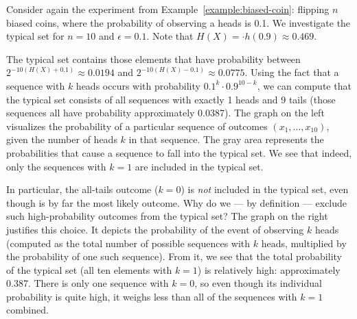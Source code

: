 \begin{example}\label{example:typical-set}
Consider again the experiment from Example~\ref{example:biased-coin}: flipping $n$ biased coins, where the probability of observing a heads is 0.1. We investigate the typical set for $n = 10$ and $\epsilon = 0.1$. Note that $H(X) = \cdot h(0.9) \approx 0.469$.

The typical set contains those elements that have probability between $2^{-10 (H(X) + 0.1)} \approx 0.0194$ and $2^{-10 (H(X) - 0.1)} \approx 0.0775$. Using the fact that a sequence with $k$ heads occurs with probability $0.1^k \cdot 0.9^{10-k}$, we can compute that the typical set consists of all sequences with exactly 1 heads and 9 tails (those sequences all have probability approximately 0.0387). The graph on the left visualizes the probability of a particular sequence of outcomes $(x_1, ..., x_{10})$, given the number of heads $k$ in that sequence. The gray area represents the probabilities that cause a sequence to fall into the typical set. We see that indeed, only the sequences with $k = 1$ are included in the typical set.

\begin{center}
\qquad \qquad
{}
\end{center}

In particular, the all-tails outcome ($k = 0$) is \emph{not} included in the typical set, even though is by far the most likely outcome. Why do we --- by definition --- exclude such high-probability outcomes from the typical set? The graph on the right justifies this choice. It depicts the probability of the event of observing $k$ heads (computed as the total number of possible sequences with $k$ heads, multiplied by the probability of one such sequence). From it, we see that the total probability of the typical set (all ten elements with $k = 1$) is relatively high: approximately 0.387. There is only one sequence with $k = 0$, so even though its individual probability is quite high, it weighs less than all of the sequences with $k = 1$ combined.


\end{example}
